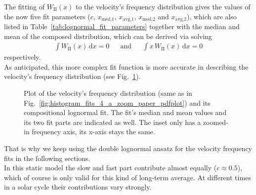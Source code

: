 The fitting of $W_\text{II}(x)$ to the velocity's frequency distribution gives the values of the now five fit parameters ($c$, $x_\text{med,1}$, $x_\text{avg,1}$, $x_\text{med,2}$ and $x_\text{avg,2}$), which are also listed in Table~\ref{tab:lognormal_fit_parameters} together with the median and mean of the composed distribution, which can be derived via solving
\begin{align}
	\int W_\text{II}(x)\,\text{d}x = 0	&	&\text{and}	&	&\int x\,W_\text{II}(x)\,\text{d}x = 0
\end{align}
respectively.\\
As anticipated, this more complex fit function is more accurate in describing the velocity's frequency distribution (see Fig.~\ref{fig:histogram_fits_V_a_zoom_dbl_paper_pdfplot}).
\begin{figure}
	\caption{Plot of the velocity's frequency distribution (same as in Fig.~\ref{fig:histogram_fits_4_a_zoom_paper_pdfplot}) and its compositional lognormal fit. The fit's median and mean values and its two fit parts are indicated as well. The inset only has a zoomed-in frequency axis, its x-axis stays the same.}
	\label{fig:histogram_fits_V_a_zoom_dbl_paper_pdfplot}
\end{figure}
That is why we keep using the double lognormal ansatz for the velocity frequency fits in the following sections.\\
In this static model the slow and fast part contribute almost equally ($c \approx 0.5$), which of course is only valid for this kind of long-term average. At different times in a solar cycle their contributions vary strongly.\\

